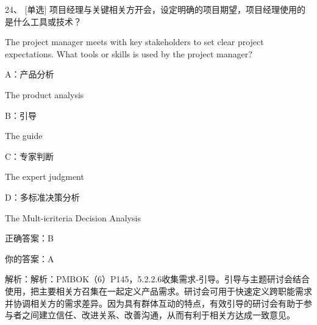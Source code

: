 24、 [单选] 项目经理与关键相关方开会，设定明确的项目期望，项目经理使用的是什么工具或技术？

The project manager meets with key stakeholders to set clear project expectations. What tools or skills is used by the project manager?

A：产品分析

The product analysis

B：引导

The guide

C：专家判断

The expert judgment

D：多标准决策分析

The Mult-icriteria Decision Analysis

正确答案：B

你的答案：A

解析：解析：PMBOK（6）P145，5.2.2.6收集需求-引导。引导与主题研讨会结合使用，把主要相关方召集在一起定义产品需求。研讨会可用于快速定义跨职能需求并协调相关方的需求差异。因为具有群体互动的特点，有效引导的研讨会有助于参与者之间建立信任、改进关系、改善沟通，从而有利于相关方达成一致意见。



